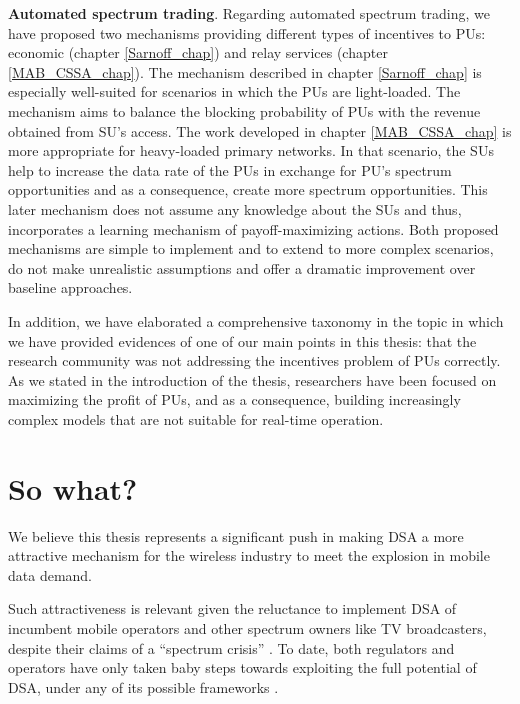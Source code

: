 \textbf{Automated spectrum trading}. Regarding automated spectrum trading, we have proposed two mechanisms providing different types of incentives to PUs: economic (chapter \ref{Sarnoff_chap}) and relay services (chapter \ref{MAB_CSSA_chap}). The mechanism described in chapter \ref{Sarnoff_chap} is especially well-suited for scenarios in which the PUs are light-loaded. The mechanism aims to balance the blocking probability of PUs with the revenue obtained from SU's access. The work developed in chapter \ref{MAB_CSSA_chap} is more appropriate for heavy-loaded primary networks. In that scenario, the SUs help to increase the data rate of the PUs in exchange for PU's spectrum opportunities and as a consequence, create more spectrum opportunities. This later mechanism does not assume any knowledge about the SUs and thus, incorporates a learning mechanism of payoff-maximizing actions. Both proposed mechanisms are simple to implement and to extend to more complex scenarios, do not make unrealistic assumptions and offer a dramatic improvement over baseline approaches. %

In addition, we have elaborated a comprehensive taxonomy in the topic in which we have provided evidences of one of our main points in this thesis: that the research community was not addressing the incentives problem of PUs correctly. As we stated in the introduction of the thesis, researchers have been focused on maximizing the profit of PUs, and as a consequence, building increasingly complex models that are not suitable for real-time operation.

\section{So what?} %
We believe this thesis represents a significant push in making DSA a more attractive mechanism for the wireless industry to meet the explosion in mobile data demand. 

Such attractiveness is relevant given the reluctance to implement DSA of incumbent mobile operators and other spectrum owners like TV broadcasters, despite their claims of a \enquote{spectrum crisis} \cite{Chen2012b}. To date, both regulators and operators have only taken baby steps towards exploiting the full potential of DSA, under any of its possible frameworks \cite{Nuechterlein2013, ref:Kelly2012}.

